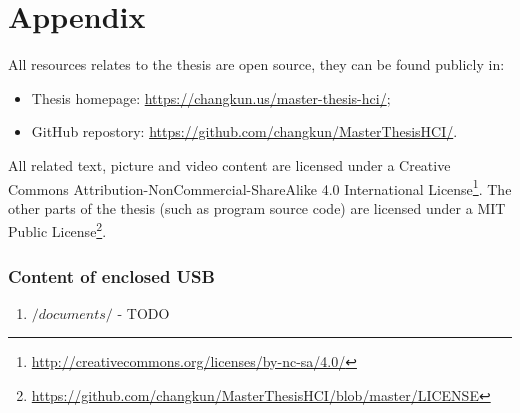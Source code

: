 \part*{Appendix}
\appendix
{}
\fancyhead[LE,RO,LO,RE]{}

All resources relates to the thesis are open source, they can be found publicly in:

\begin{itemize}
    \item Thesis homepage: \url{https://changkun.us/master-thesis-hci/};
    \item GitHub repostory: \url{https://github.com/changkun/MasterThesisHCI/}.
\end{itemize}

All related text, picture and video content are licensed under a Creative Commons Attribution-NonCommercial-ShareAlike 4.0 International License\footnote{\url{http://creativecommons.org/licenses/by-nc-sa/4.0/}}.
The other parts of the thesis (such as program source code) are licensed under a MIT Public License\footnote{\url{https://github.com/changkun/MasterThesisHCI/blob/master/LICENSE}}.

\section{Content of enclosed USB}
\label{appendix:a}

\begin{enumerate}
    \item $/documents/$ - TODO
\end{enumerate}